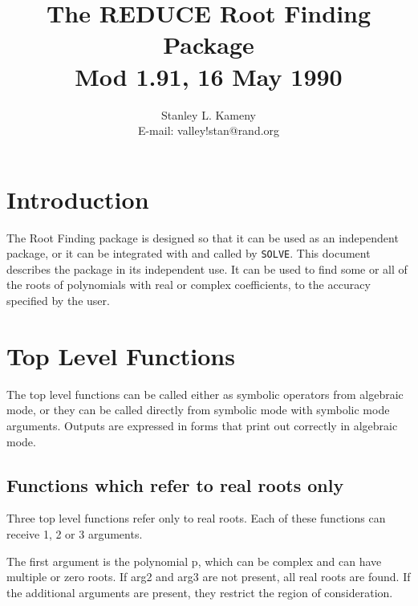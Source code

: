 \title{The REDUCE Root Finding Package \\ Mod 1.91, 16 May 1990}
\date{}
\author {Stanley L. Kameny \\ E-mail: valley!stan@rand.org}

\maketitle
{} 

\section{Introduction}

The Root Finding package is designed so that it can be used as an
independent package, or it can be integrated with and called by {\tt SOLVE}.
This document describes the package in its independent use.  It can be
used to find some or all of the roots of polynomials with real or
complex coefficients, to the accuracy specified by the user.

\section{Top Level Functions}

The top level functions can be called either as symbolic operators from
algebraic mode, or they can be called directly from symbolic mode with
symbolic mode arguments.  Outputs are expressed in forms that print out
correctly in algebraic mode.


\subsection{Functions which refer to real roots only}

Three top level functions refer only to real roots.  Each of these
functions can receive 1, 2 or 3 arguments.

The first argument is the polynomial p, which can be complex and can
have multiple or zero roots.  If arg2 and arg3 are not present, all real
roots are found.  If the additional arguments are present, they restrict
the region of consideration.
                                                    
